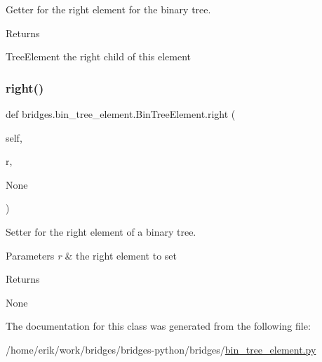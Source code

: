 Getter for the right element for the binary tree. 

\begin{DoxyReturn}{Returns}


Tree\+Element the right child of this element 
\end{DoxyReturn}
\mbox{\label{classbridges_1_1bin__tree__element_1_1_bin_tree_element_a8a009b8fe2744859abc8bfe89ccce697}} 
\subsubsection{\texorpdfstring{right()}{right()}\hspace{0.1cm}{\footnotesize\ttfamily [2/2]}}
{\footnotesize\ttfamily def bridges.\+bin\+\_\+tree\+\_\+element.\+Bin\+Tree\+Element.\+right (\begin{DoxyParamCaption}\item[{}]{self,  }\item[{}]{r,  }\item[{}]{None }\end{DoxyParamCaption})}



Setter for the right element of a binary tree. 


\begin{DoxyParams}{Parameters}
{\em r} & the right element to set \\
\hline
\end{DoxyParams}
\begin{DoxyReturn}{Returns}


None 
\end{DoxyReturn}


The documentation for this class was generated from the following file\+:\begin{DoxyCompactItemize}
\item 
/home/erik/work/bridges/bridges-\/python/bridges/\hyperlink{bin__tree__element_8py}{bin\+\_\+tree\+\_\+element.\+py}\end{DoxyCompactItemize}
